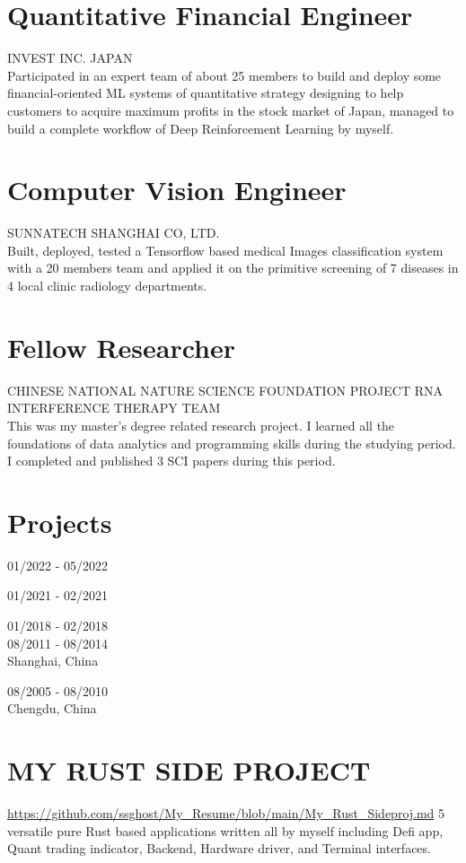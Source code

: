 \documentclass[10pt]{article}
\begin{document}
\section*{Quantitative Financial Engineer}
INVEST INC. JAPAN\\
Participated in an expert team of about 25 members to build and deploy some financial-oriented ML systems of quantitative strategy designing to help customers to acquire maximum profits in the stock market of Japan, managed to build a complete workflow of Deep Reinforcement Learning by myself.

\section*{Computer Vision Engineer}
SUNNATECH SHANGHAI CO, LTD.\\
Built, deployed, tested a Tensorflow based medical Images classification system with a 20 members team and applied it on the primitive screening of 7 diseases in 4 local clinic radiology departments.

\section*{Fellow Researcher}
CHINESE NATIONAL NATURE SCIENCE FOUNDATION PROJECT RNA INTERFERENCE THERAPY TEAM\\
This was my master's degree related research project. I learned all the foundations of data analytics and programming skills during the studying period. I completed and published 3 SCI papers during this period.

\section*{Projects}
01/2022 - 05/2022

01/2021 - 02/2021

01/2018 - 02/2018\\
08/2011 - 08/2014\\
Shanghai, China

08/2005 - 08/2010\\
Chengdu, China

\section*{MY RUST SIDE PROJECT}
\href{https://github.com/ssghost/My_Resume/blob/main/My_Rust_Sideproj.md}{https://github.com/ssghost/My\_Resume/blob/main/My\_Rust\_Sideproj.md} 5 versatile pure Rust based applications written all by myself including Defi app, Quant trading indicator, Backend, Hardware driver, and Terminal interfaces.
\end{document}
